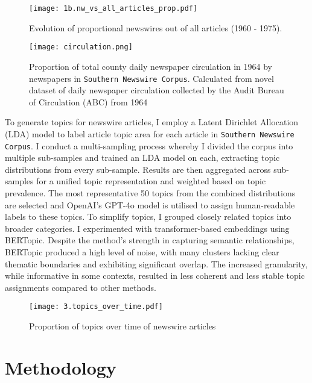 \documentclass{article}
\begin{document}
\begin{figure}[htbp]
\centering
\texttt{[image: 1b.nw\_vs\_all\_articles\_prop.pdf]}
\caption{Evolution of proportional newswires out of all articles (1960 - 1975).}
\label{fig:nw_proportions}
\end{figure}



\begin{figure}[htp]
\centering
\texttt{[image: circulation.png]}
\caption{\small{Proportion of total county daily newspaper circulation in 1964 by newspapers in \texttt{Southern Newswire Corpus}. Calculated from novel dataset of daily newspaper circulation
collected by the Audit Bureau of Circulation (ABC) from 1964}}
\label{fig:county_circulation}
\end{figure}

To generate topics for newswire articles, I employ a Latent Dirichlet Allocation (LDA) model to label article topic area for each article in \texttt{Southern Newswire Corpus}. I conduct a multi-sampling process whereby I divided the corpus into multiple sub-samples and trained an LDA model on each, extracting topic distributions from every sub-sample. Results are then aggregated across sub-samples for a unified topic representation and weighted based on topic prevalence. The most representative 50 topics from the combined distributions are selected and OpenAI’s GPT-4o model is utilised to assign human-readable labels to these topics. To simplify topics, I grouped closely related topics into broader categories. I experimented with transformer-based embeddings using BERTopic. Despite the method's strength in capturing semantic relationships, BERTopic produced a high level of noise, with many clusters lacking clear thematic boundaries and exhibiting significant overlap. The increased granularity, while informative in some contexts, resulted in less coherent and less stable topic assignments compared to other methods. 

\begin{figure}[htp]
\centering
\texttt{[image: 3.topics\_over\_time.pdf]}
\caption{\small{Proportion of topics over time of newswire articles}}
\label{fig:topics}
\end{figure}

\section{Methodology}
\label{sec:methodology}
\end{document}
